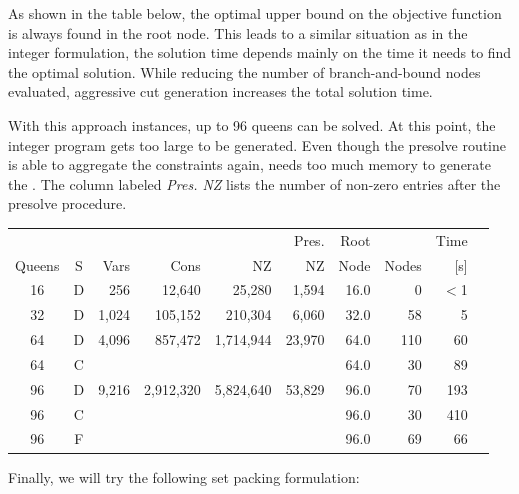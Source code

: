 \medskip
\noindent As shown in the table below, the optimal upper bound on the objective
function is always found in the root node. This leads to a similar
situation as in the integer formulation, \ie the solution time depends
mainly on the time it needs to find the optimal solution. While
reducing the number of branch-and-bound nodes evaluated,
aggressive cut generation increases the total solution time.

With this approach instances, up to 96 queens can be solved.
At this point, the integer program gets too large to be generated.
Even though the \cplex presolve routine is able to aggregate the
constraints  again, \zimpl needs too much memory to generate the \ip.
The column labeled \emph{Pres. NZ} lists the number of non-zero entries
after the presolve procedure.

\begin{center}
{\sffamily\small
\begin{tabular}{ccrrrrrrrr}
\toprule
       &   &      &      &        & Pres. & Root &       & Time    \\
Queens & S & Vars & Cons &   NZ   &  NZ   & Node & Nodes & [s]\\
\midrule
  16   & D &   256 &    12,640 &    25,280 &  1,594 & 16.0 &       0 & $<$1\\
  32   & D & 1,024 &   105,152 &   210,304 &  6,060 & 32.0 &      58 & 5  \\
  64   & D & 4,096 &   857,472 & 1,714,944 & 23,970 & 64.0 &     110 & 60\\
  64   & C &       &           &           &        & 64.0 &      30 & 89\\
  96   & D & 9,216 & 2,912,320 & 5,824,640 & 53,829 & 96.0 &      70 & 193\\
  96   & C &       &           &           &        & 96.0 &      30 & 410\\
  96   & F &       &           &           &        & 96.0 &      69 & 66\\
\bottomrule
\end{tabular}
}
\end{center}

Finally, we will try the following set packing formulation:

